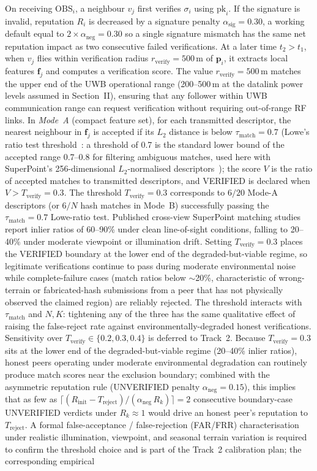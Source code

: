 \documentclass[conference,10pt]{IEEEtran}
\begin{document}
On receiving $\mathrm{OBS}_i$, a neighbour $v_j$ first verifies $\sigma_i$ using $\mathrm{pk}_i$. If the signature is invalid, reputation $R_i$ is decreased by a signature penalty $\alpha_\text{sig} = 0.30$, a working default equal to $2 \times \alpha_\text{neg} = 0.30$ so a single signature mismatch has the same net reputation impact as two consecutive failed verifications. At a later time $t_2 > t_1$, when $v_j$ flies within verification radius $r_\text{verify} = 500$\,m of $\mathbf{p}_i$, it extracts local features $\mathbf{f}_j$ and computes a verification score. The value $r_\text{verify} = 500$\,m matches the upper end of the UWB operational range (200--500\,m at the datalink power levels assumed in Section~II), ensuring that any follower within UWB communication range can request verification without requiring out-of-range RF links. In \emph{Mode~A} (compact feature set), for each transmitted descriptor, the nearest neighbour in $\mathbf{f}_j$ is accepted if its $L_2$ distance is below $\tau_\text{match} = 0.7$ (Lowe's ratio test threshold~\cite{lowe2004distinctive}: a threshold of 0.7 is the standard lower bound of the accepted range 0.7--0.8 for filtering ambiguous matches, used here with SuperPoint's 256-dimensional $L_2$-normalised descriptors~\cite{detone2018superpoint}); the score $V$ is the ratio of accepted matches to transmitted descriptors, and VERIFIED is declared when $V > T_\text{verify} = 0.3$. The threshold $T_\text{verify}=0.3$ corresponds to $6/20$ Mode-A descriptors (or $6/N$ hash matches in Mode~B) successfully passing the $\tau_\text{match}=0.7$ Lowe-ratio test. Published cross-view SuperPoint matching studies report inlier ratios of 60--90\% under clean line-of-sight conditions, falling to 20--40\% under moderate viewpoint or illumination drift. Setting $T_\text{verify}=0.3$ places the VERIFIED boundary at the lower end of the degraded-but-viable regime, so legitimate verifications continue to pass during moderate environmental noise while complete-failure cases (match ratios below $\sim$20\%, characteristic of wrong-terrain or fabricated-hash submissions from a peer that has not physically observed the claimed region) are reliably rejected. The threshold interacts with $\tau_\text{match}$ and $N,K$: tightening any of the three has the same qualitative effect of raising the false-reject rate against environmentally-degraded honest verifications. Sensitivity over $T_\text{verify}\in\{0.2, 0.3, 0.4\}$ is deferred to Track~2. Because $T_\text{verify}=0.3$ sits at the lower end of the degraded-but-viable regime (20--40\% inlier ratios), honest peers operating under moderate environmental degradation can routinely produce match scores near the exclusion boundary; combined with the asymmetric reputation rule (UNVERIFIED penalty $\alpha_\text{neg}=0.15$), this implies that as few as $\lceil(R_\text{init}-T_\text{reject})/(\alpha_\text{neg}\, R_k)\rceil=2$ consecutive boundary-case UNVERIFIED verdicts under $R_k\!\approx\!1$ would drive an honest peer's reputation to $T_\text{reject}$. A formal false-acceptance / false-rejection (FAR/FRR) characterisation under realistic illumination, viewpoint, and seasonal terrain variation is required to confirm the threshold choice and is part of the Track~2 calibration plan; the corresponding empirical 
\end{document}
